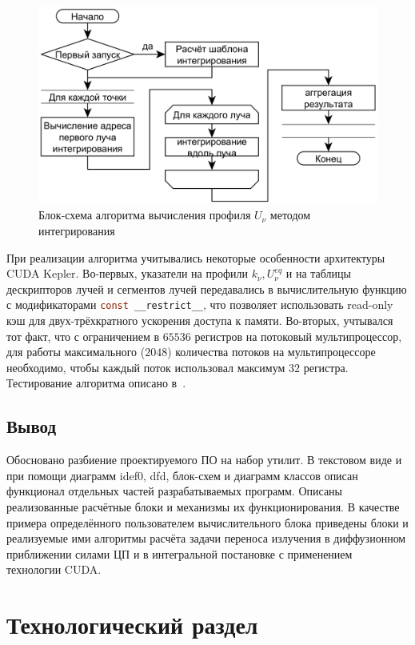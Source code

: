 \begin{figure}
    \centering
    \includegraphics[width=.9\linewidth]{img/luminInt/flowchartint}
    \caption{Блок-схема алгоритма вычисления профиля $U_\nu$ методом 
    интегрирования}
    \label{fig:flowchart}
\end{figure}

При реализации алгоритма учитывались некоторые особенности архитектуры CUDA 
Kepler. Во-первых, указатели на профили $k_\nu, U_\nu^{eq}$ и на таблицы 
дескрипторов лучей и сегментов лучей передавались в вычислительную функцию с 
модификаторами \lstinline[language=c]|const __restrict__|, что позволяет 
использовать read-only кэш для двух-трёхкратного ускорения доступа к 
памяти\cite{cudaptr}.
Во-вторых, учтывался тот факт, что с ограничением в $65536$ регистров на 
потоковый мультипроцессор, для работы максимального ($2048$) количества потоков 
на мультипроцессоре необходимо, чтобы каждый поток использовал максимум $32$ 
регистра.
Тестирование алгоритма описано в~\cite{integral}.

\subsection{Вывод}
Обосновано разбиение проектируемого ПО на набор утилит. В текстовом виде и при 
помощи диаграмм idef0, dfd, блок-схем и диаграмм классов описан функционал 
отдельных частей разрабатываемых программ. Описаны реализованные расчётные 
блоки и механизмы их функционирования. В качестве примера определённого 
пользователем вычислительного блока приведены блоки и реализуемые ими алгоритмы 
расчёта задачи переноса излучения в диффузионном приближении силами ЦП и в 
интегральной постановке с применением технологии CUDA.

\section{Технологический раздел}
